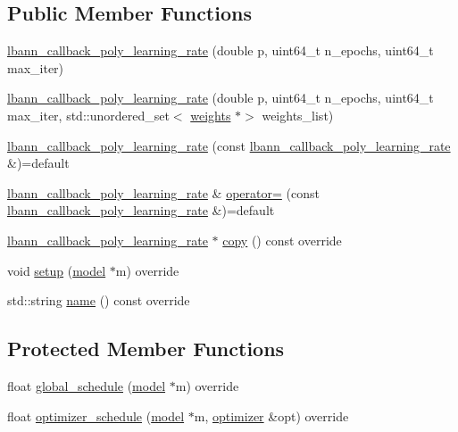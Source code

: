 \subsection*{Public Member Functions}
\begin{DoxyCompactItemize}
\item 
\hyperlink{classlbann_1_1lbann__callback__poly__learning__rate_ac36d25516687e0d0c43b51acae9eb1ff}{lbann\+\_\+callback\+\_\+poly\+\_\+learning\+\_\+rate} (double p, uint64\+\_\+t n\+\_\+epochs, uint64\+\_\+t max\+\_\+iter)
\item 
\hyperlink{classlbann_1_1lbann__callback__poly__learning__rate_a4aba2a61c3b5d08c08909b7a4d78ea74}{lbann\+\_\+callback\+\_\+poly\+\_\+learning\+\_\+rate} (double p, uint64\+\_\+t n\+\_\+epochs, uint64\+\_\+t max\+\_\+iter, std\+::unordered\+\_\+set$<$ \hyperlink{classlbann_1_1weights}{weights} $\ast$$>$ weights\+\_\+list)
\item 
\hyperlink{classlbann_1_1lbann__callback__poly__learning__rate_a9c55d816c11b6c79d0bbc145e7211995}{lbann\+\_\+callback\+\_\+poly\+\_\+learning\+\_\+rate} (const \hyperlink{classlbann_1_1lbann__callback__poly__learning__rate}{lbann\+\_\+callback\+\_\+poly\+\_\+learning\+\_\+rate} \&)=default
\item 
\hyperlink{classlbann_1_1lbann__callback__poly__learning__rate}{lbann\+\_\+callback\+\_\+poly\+\_\+learning\+\_\+rate} \& \hyperlink{classlbann_1_1lbann__callback__poly__learning__rate_a5e93001766ab49b38d0cc387362970e3}{operator=} (const \hyperlink{classlbann_1_1lbann__callback__poly__learning__rate}{lbann\+\_\+callback\+\_\+poly\+\_\+learning\+\_\+rate} \&)=default
\item 
\hyperlink{classlbann_1_1lbann__callback__poly__learning__rate}{lbann\+\_\+callback\+\_\+poly\+\_\+learning\+\_\+rate} $\ast$ \hyperlink{classlbann_1_1lbann__callback__poly__learning__rate_aea01c416903c421cf6dce1a7f320c94b}{copy} () const override
\item 
void \hyperlink{classlbann_1_1lbann__callback__poly__learning__rate_a47d3d2a94157f1992bf4a964620208f3}{setup} (\hyperlink{classlbann_1_1model}{model} $\ast$m) override
\item 
std\+::string \hyperlink{classlbann_1_1lbann__callback__poly__learning__rate_a755be6dc66e1c403edc69db11592a4ea}{name} () const override
\end{DoxyCompactItemize}
\subsection*{Protected Member Functions}
\begin{DoxyCompactItemize}
\item 
float \hyperlink{classlbann_1_1lbann__callback__poly__learning__rate_a6302be36ef16079105b812c7599dac76}{global\+\_\+schedule} (\hyperlink{classlbann_1_1model}{model} $\ast$m) override
\item 
float \hyperlink{classlbann_1_1lbann__callback__poly__learning__rate_a55414af733e519be126572ec92492bf7}{optimizer\+\_\+schedule} (\hyperlink{classlbann_1_1model}{model} $\ast$m, \hyperlink{classlbann_1_1optimizer}{optimizer} \&opt) override
\end{DoxyCompactItemize}
